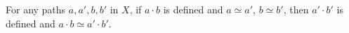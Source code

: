 For any paths $a, a', b, b'$ in $X$, if $a \cdot b$ is defined and $a \simeq a'$, $b \simeq b'$, then $a' \cdot b'$ is defined and $a \cdot b \simeq a' \cdot b'$.
